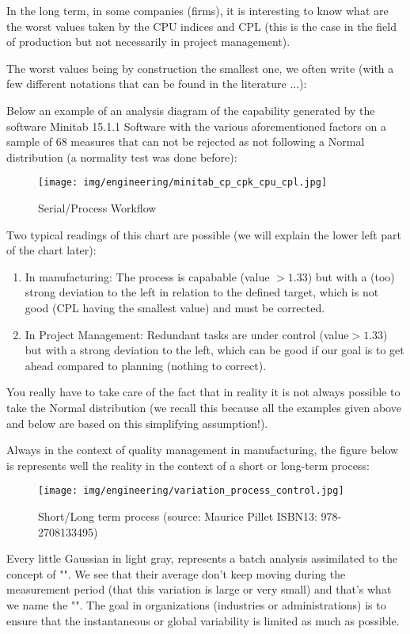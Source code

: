 		In the long term, in some companies (firms), it is interesting to know what are the worst values taken by the CPU indices and CPL (this is the case in the field of production but not necessarily in project management).
		
		The worst values being by construction the smallest one, we often write (with a few different notations that can be found in the literature ...):
		

Below an example of an analysis diagram of the capability generated by the software Minitab 15.1.1 Software with the various aforementioned factors on a sample of 68 measures that can not be rejected as not following a Normal distribution (a normality test was done before):

\begin{figure}[H]
\centering
\texttt{[image: img/engineering/minitab\_cp\_cpk\_cpu\_cpl.jpg]}
\caption{Serial/Process Workflow}
\end{figure}

Two typical readings of this chart are possible (we will explain the lower left part of the chart later):
	\begin{enumerate}
		\item In manufacturing: The process is capabable (value $>1.33$) but with a (too) strong deviation to the left in relation to the defined target, which is not good (CPL having the smallest value) and must be corrected.
		\item In Project Management: Redundant tasks are under control (value$>1.33$) but with a strong deviation to the left, which can be good if our goal is to get ahead compared to planning (nothing to correct).
	\end{enumerate}
	You really have to take care of the fact that in reality it is not always possible to take the Normal distribution (we recall this because all the examples given above and below are based on this simplifying assumption!).
	
	Always in the context of quality management in manufacturing, the figure below is represents well the reality in the context of a short or long-term process\label{short and long term process}:
	\begin{figure}[H]
		\centering
		\texttt{[image: img/engineering/variation\_process\_control.jpg]}
		\caption[Short/Long term process]{Short/Long term process (source: Maurice Pillet ISBN13: 978-2708133495)}
	\end{figure}
	Every little Gaussian in light gray, represents a batch analysis assimilated to the concept of "". We see that their average don't keep moving during the measurement period (that this variation is large or very small) and that's what we name the "". The goal in organizations (industries or administrations) is to ensure that the instantaneous or global variability is limited as much as possible.
	

